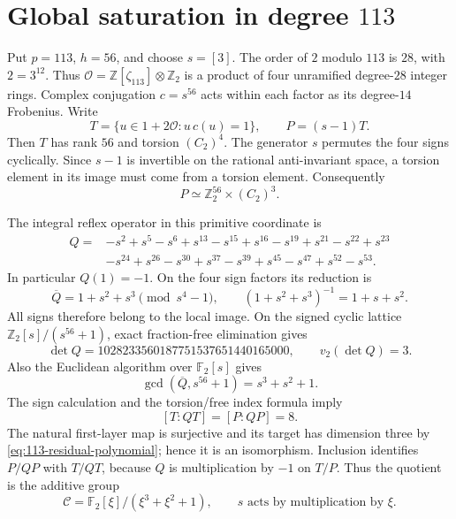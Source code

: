 \section{Global saturation in degree \(113\)}
\label{sec:global-cm-113}

Put \(p=113\), \(h=56\), and choose \(s=[3]\).
The order of \(2\) modulo \(113\) is \(28\), with \(2=3^{12}\).
Thus
\(\mathcal O=\mathbb Z[\zeta_{113}]\otimes\mathbb Z_2\)
is a product of four unramified degree-\(28\) integer rings.
Complex conjugation \(c=s^{56}\) acts within each factor
as its degree-\(14\) Frobenius. Write
\[
 T=\{u\in1+2\mathcal O:u\,c(u)=1\},\qquad P=(s-1)T.
\]
Then \(T\) has rank \(56\) and torsion \((C_2)^4\).
The generator \(s\) permutes the four signs cyclically.
Since \(s-1\) is invertible on the rational anti-invariant
space, a torsion element in its image must come from a
torsion element. Consequently
\begin{equation}
 P\simeq\mathbb Z_2^{56}\times(C_2)^3.
 \label{eq:113-full-target}
\end{equation}

The integral reflex operator in this primitive coordinate is
\[
\begin{split}
 Q={}&-s^2+s^5-s^6+s^{13}-s^{15}+s^{16}-s^{19}
       +s^{21}-s^{22}+s^{23}\\
    &-s^{24}+s^{26}-s^{30}+s^{37}-s^{39}
       +s^{45}-s^{47}+s^{52}-s^{53}.
\end{split}
\]
In particular \(Q(1)=-1\). On the four sign factors its
reduction is
\begin{equation}
 \overline Q=1+s^2+s^3\pmod{s^4-1},\qquad
 (1+s^2+s^3)^{-1}=1+s+s^2.
 \label{eq:113-sign-inverse}
\end{equation}
All signs therefore belong to the local image.
On the signed cyclic lattice \(\mathbb Z_2[s]/(s^{56}+1)\),
exact fraction-free elimination gives
\[
 \det Q=1028233560187751537651440165000,\qquad
 v_2(\det Q)=3.
\]
Also the Euclidean algorithm over \(\mathbb F_2[s]\) gives
\begin{equation}
 \gcd(\overline Q,s^{56}+1)=s^3+s^2+1.
 \label{eq:113-residual-polynomial}
\end{equation}
The sign calculation and the torsion/free index formula imply
\[
 [T:QT]=[P:QP]=8.
\]
The natural first-layer map is surjective and its target has
dimension three by \eqref{eq:113-residual-polynomial};
hence it is an isomorphism. Inclusion identifies \(P/QP\)
with \(T/QT\), because \(Q\) is multiplication by \(-1\)
on \(T/P\). Thus the quotient is the additive group
\begin{equation}
 \mathscr C=\mathbb F_2[\xi]/(\xi^3+\xi^2+1),
 \qquad s\text{ acts by multiplication by }\xi.
 \label{eq:113-residual-field}
\end{equation}


